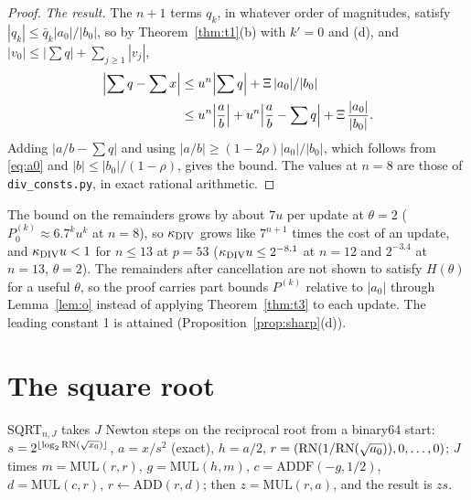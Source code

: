 \begin{proof}
\emph{The result.} The $n+1$ terms $q_k$, in whatever order of magnitudes, satisfy $|q_k| \le \bar q_k|a_0|/|b_0|$, so by
Theorem~\ref{thm:t1}(b) with $k' = 0$ and (d), and $|v_0| \le |\sum q| + \sum_{j \ge 1}|v_j|$,
\begin{align*}
\Bigl|\sum q - \sum x\Bigr| &\le u^n\Bigl|\sum q\Bigr| + \Xi\,|a_0|/|b_0| \\
&\le u^n\Bigl|\frac ab\Bigr| + u^n\Bigl|\frac ab - \sum q\Bigr| + \Xi\,\frac{|a_0|}{|b_0|}.
\end{align*}
Adding $|a/b - \sum q|$ and using $|a/b| \ge (1-2\rho)|a_0|/|b_0|$, which follows from \eqref{eq:a0} and $|b| \le
|b_0|/(1-\rho)$, gives the bound. The values at $n = 8$ are those of \texttt{div\_consts.py}, in exact rational
arithmetic.
\end{proof}

\begin{remark}
The bound on the remainders grows by about $7u$ per update at $\theta = 2$ ($P^{(k)}_0 \approx 6.7^k u^k$ at $n = 8$),
so $\kappa_{\rm DIV}$ grows like $7^{n+1}$ times the cost of an update, and $\kappa_{\rm DIV} u < 1$ for $n \le 13$ at $p = 53$
($\kappa_{\rm DIV} u \le 2^{-8.1}$ at $n = 12$ and $2^{-3.4}$ at $n = 13$, $\theta = 2$). The remainders after cancellation are not shown to satisfy $H(\theta)$ for a useful
$\theta$, so the proof carries part bounds $P^{(k)}$ relative to $|a_0|$ through Lemma~\ref{lem:o} instead of applying
Theorem~\ref{thm:t3} to each update. The leading constant 1 is attained (Proposition~\ref{prop:sharp}(d)).
\end{remark}

\section{The square root}\label{sec:sqrt}

SQRT$_{n,J}$ takes $J$ Newton steps on the reciprocal root from a binary64 start: $s = 2^{\lfloor\log_2\mathrm{RN}(\sqrt{x_0})\rfloor}$, $a = x/s^2$
(exact), $h = a/2$, $r = (\mathrm{RN}(1/\mathrm{RN}(\sqrt{a_0})), 0, \dots, 0)$; $J$ times $m = \mathrm{MUL}(r, r)$, $g =
\mathrm{MUL}(h, m)$, $c = \mathrm{ADDF}(-g, 1/2)$, $d = \mathrm{MUL}(c, r)$, $r \gets \mathrm{ADD}(r, d)$; then $z =
\mathrm{MUL}(r, a)$, and the result is $zs$.

